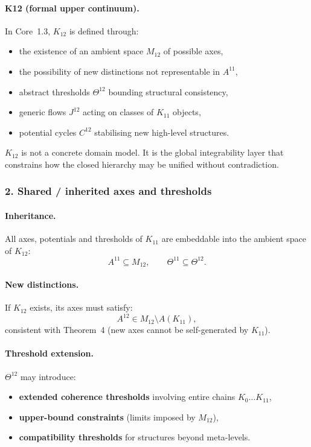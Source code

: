 \paragraph{K12 (formal upper continuum).}
In Core~1.3, $K_{12}$ is defined through:
\begin{itemize}
  \item the existence of an ambient space $M_{12}$ of possible axes,
  \item the possibility of new distinctions not representable in $A^{11}$,
  \item abstract thresholds $\Theta^{12}$ bounding structural consistency,
  \item generic flows $J^{12}$ acting on classes of $K_{11}$ objects,
  \item potential cycles $C^{12}$ stabilising new high-level structures.
\end{itemize}

$K_{12}$ is not a concrete domain model. It is the global integrability layer
that constrains how the closed hierarchy may be unified without contradiction.

\subsubsection{2. Shared / inherited axes and thresholds}

\paragraph{Inheritance.}
All axes, potentials and thresholds of $K_{11}$ are embeddable into the
ambient space of $K_{12}$:
\[
A^{11} \subseteq M_{12}, \qquad
\Theta^{11} \subseteq \Theta^{12}.
\]

\paragraph{New distinctions.}
If $K_{12}$ exists, its axes must satisfy:
\[
A^{12} \in M_{12} \setminus A(K_{11}),
\]
consistent with Theorem~4 (new axes cannot be self-generated by $K_{11}$).

\paragraph{Threshold extension.}
$\Theta^{12}$ may introduce:
\begin{itemize}
  \item \textbf{extended coherence thresholds} involving entire chains
        $K_0\dots K_{11}$,
  \item \textbf{upper-bound constraints} (limits imposed by $M_{12}$),
  \item \textbf{compatibility thresholds} for structures beyond meta-levels.
\end{itemize}

